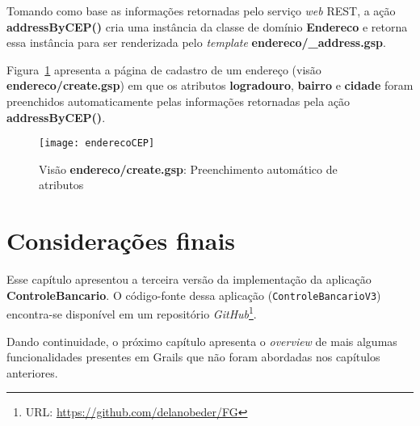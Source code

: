 Tomando como base as informações retornadas  pelo serviço {\it web} REST, a ação
{\bf addressByCEP()}  cria uma instância da  classe de domínio  {\bf Endereco} e
retorna  essa   instância  para  ser   renderizada  pelo  {\it   template}  {\bf
  endereco/\_address.gsp}. 

\vspace{0.2cm}

Figura~\ref{figEnderecoCEP} apresenta a página de cadastro de um endereço (visão
{\bf endereco/create.gsp}) em que os  atributos {\bf logradouro}, {\bf bairro} e
{\bf cidade} foram preenchidos automaticamente pelas informações retornadas pela
ação {\bf addressByCEP()}.  

\vspace{0.3cm}

\begin{figure}[htbp]
\centering\texttt{[image: enderecoCEP]}
\caption{Visão {\bf endereco/create.gsp}: Preenchimento automático de atributos}
\label{figEnderecoCEP}
\end{figure}

\newpage

\section{Considerações finais}

\vspace{0.3cm}

Esse capítulo  apresentou a terceira  versão da implementação da  aplicação {\bf
  ControleBancario}.         O        código-fonte        dessa        aplicação
({\footnotesize\texttt{ControleBancarioV3}})   encontra-se   disponível  em   um
repositório {\it GitHub}\footnote{URL: {\url{https://github.com/delanobeder/FG}}}.  

\vspace{0.2cm}

Dando  continuidade, o  próximo  capítulo  apresenta o  {\it  overview} de  mais
algumas  funcionalidades  presentes  em  Grails  que  não  foram  abordadas  nos
capítulos anteriores.  

